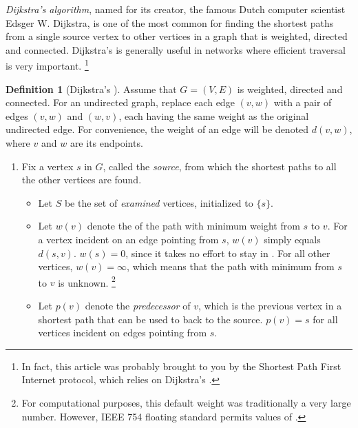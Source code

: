 \documentclass[12pt]{article}
\begin{document}
\emph{Dijkstra's algorithm}, named for its creator, the famous Dutch computer scientist Edsger W. Dijkstra, is one of the most common  for finding the shortest paths from a single source vertex to other vertices in a graph that is weighted, directed and connected. Dijkstra's  is generally useful in networks where efficient traversal is very important. \footnote{In fact, this article was probably brought to you by the  Shortest Path First Internet protocol, which relies on Dijkstra's .}

\theoremstyle{definition}
\newtheorem*{dijkstrasAlgorithm}{Definition}
\begin{dijkstrasAlgorithm}[Dijkstra's ]

Assume that $G = (V,E)$ is weighted, directed and connected. For an undirected graph, replace each edge $(v,w)$ with a pair of edges $(v,w)$ and $(w,v)$, each having the same weight as the original undirected edge. For convenience, the weight of an edge will be denoted $d(v,w)$, where $v$ and $w$ are its endpoints.

\begin{enumerate}
\item
Fix a vertex $s$ in $G$, called the \emph{source}, from which the shortest paths to all the other vertices are found.

\begin{itemize}
\item
Let $S$ be the set of \emph{examined} vertices, initialized to $\{s\}$.

\item
Let $w(v)$ denote the  of the path with minimum weight from $s$ to $v$. For a vertex incident on an edge pointing from $s$, $w(v)$ simply equals $d(s,v)$. $w(s) = 0$, since it takes no effort to stay in . For all other vertices, $w(v) = \infty$, which means that the path with minimum  from $s$ to $v$ is unknown. \footnote{For computational purposes, this default weight was traditionally a very large number. However, IEEE 754 floating  standard permits values of .}

\item
Let $p(v)$ denote the \emph{predecessor} of $v$, which is the previous vertex in a shortest path that can be used to  back to the source. $p(v) = s$ for all vertices incident on edges pointing from $s$. 
\end{itemize}


\end{enumerate}
\end{dijkstrasAlgorithm}
\end{document}
